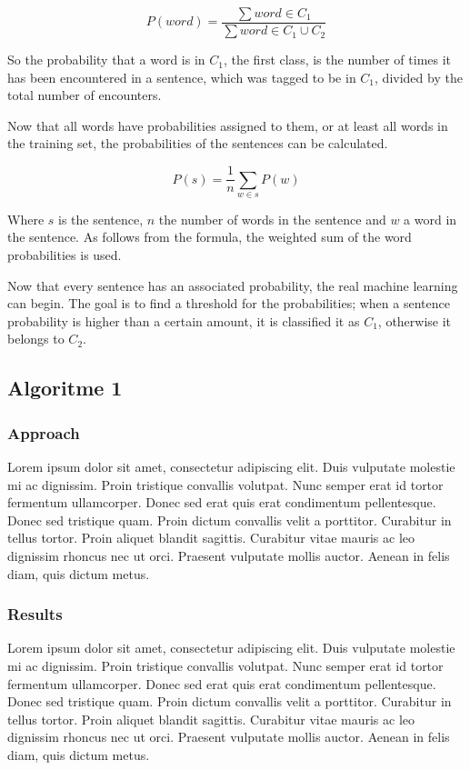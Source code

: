 \documentclass[11pt]{article}
\begin{document}
\begin{equation}
P(word) = \frac{ \sum word \in C_1}{\sum word \in C_1\cup C_2}
\end{equation}

So the probability that a word is in $C_1$, the first class, is the number of times it has been encountered in a sentence, which was tagged to be in $C_1$, divided by the total number of encounters.

Now that all words have probabilities assigned to them, or at least all words in the training set, the probabilities of the sentences can be calculated.

\begin{equation}
P(s) = \frac{1}{n} \sum_{w \in s} P(w)
\end{equation}

Where $s$ is the sentence, $n$ the number of words in the sentence and $w$ a word in the sentence. As follows from the formula,  the weighted sum of the word probabilities is used.

Now that every sentence has an associated probability, the real machine learning can begin. The goal is to find a threshold for the probabilities; when a sentence probability is higher than a certain amount, it is classified it as $C_1$,  otherwise it belongs to $C_2$.

\subsection{Algoritme 1}
\subsubsection{Approach}
Lorem ipsum dolor sit amet, consectetur adipiscing elit. Duis vulputate molestie mi ac dignissim. Proin tristique convallis volutpat. Nunc semper erat id tortor fermentum ullamcorper. Donec sed erat quis erat condimentum pellentesque. Donec sed tristique quam. Proin dictum convallis velit a porttitor. Curabitur in tellus tortor. Proin aliquet blandit sagittis. Curabitur vitae mauris ac leo dignissim rhoncus nec ut orci. Praesent vulputate mollis auctor. Aenean in felis diam, quis dictum metus.

\subsubsection{Results}
Lorem ipsum dolor sit amet, consectetur adipiscing elit. Duis vulputate molestie mi ac dignissim. Proin tristique convallis volutpat. Nunc semper erat id tortor fermentum ullamcorper. Donec sed erat quis erat condimentum pellentesque. Donec sed tristique quam. Proin dictum convallis velit a porttitor. Curabitur in tellus tortor. Proin aliquet blandit sagittis. Curabitur vitae mauris ac leo dignissim rhoncus nec ut orci. Praesent vulputate mollis auctor. Aenean in felis diam, quis dictum metus.
\end{document}
